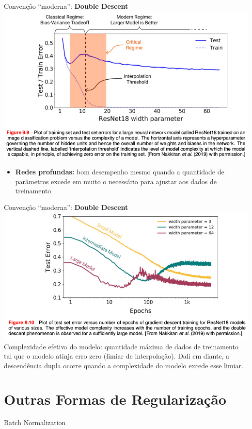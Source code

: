 \documentclass{beamer}
\begin{document}
\begin{frame}{Convenção ``moderna'': \textbf{Double Descent}} 
\includegraphics[width=\textwidth,height=0.5\textheight,keepaspectratio]{imgs/bishop_example/11.png}
  \begin{itemize}
  \item \textbf{Redes profundas:} bom desempenho mesmo quando a quantidade de parâmetros excede em muito o necessário para ajustar aos dados de treinamento 
\end{itemize}
\end{frame}

\begin{frame}{Convenção ``moderna'': \textbf{Double Descent}} 
\includegraphics[width=\textwidth,height=0.7\textheight,keepaspectratio]{imgs/bishop_example/12.png}
    \tiny{Complexidade efetiva do modelo: quantidade máxima de dados de treinamento tal que o modelo atinja erro zero (limiar de interpolação). Dali em diante, a descendência dupla ocorre quando a complexidade do modelo excede esse limiar.}
\end{frame}


\section{Outras Formas de Regularização}
\begin{frame}{Batch Normalization}
\end{frame}
\end{document}
